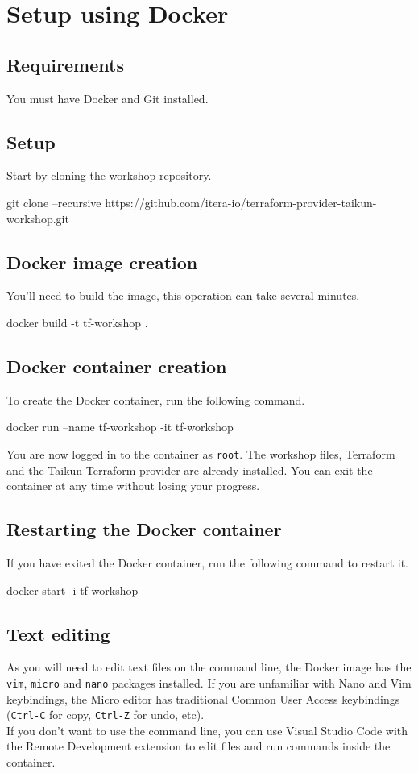 \section{Setup using Docker}\label{sec:docker}

\subsection{Requirements}
You must have Docker and Git installed.

\subsection{Setup}
Start by cloning the workshop repository.
\begin{shell}
git clone --recursive https://github.com/itera-io/terraform-provider-taikun-workshop.git
\end{shell}

\subsection{Docker image creation}
You'll need to build the image, this operation can take several minutes.
\begin{shell}
docker build -t tf-workshop .
\end{shell}

\subsection{Docker container creation}
To create the Docker container, run the following command.
\begin{shell}
docker run --name tf-workshop -it tf-workshop
\end{shell}
You are now logged in to the container as \texttt{root}. The workshop files,
Terraform and the Taikun Terraform provider are already installed.
You can exit the container at any time without losing your progress.

\subsection{Restarting the Docker container}
If you have exited the Docker container, run the following command to restart it.
\begin{shell}
docker start -i tf-workshop
\end{shell}

\subsection{Text editing}
As you will need to edit text files on the command line,
the Docker image has the \texttt{vim}, \texttt{micro} and \texttt{nano} packages installed.
If you are unfamiliar with Nano and Vim keybindings, the Micro editor
has traditional Common User Access keybindings (\texttt{Ctrl-C} for copy,
\texttt{Ctrl-Z} for undo, etc).\\

If you don't want to use the command line, you can use Visual Studio Code with
the Remote Development extension to edit files and run commands inside the
container.
